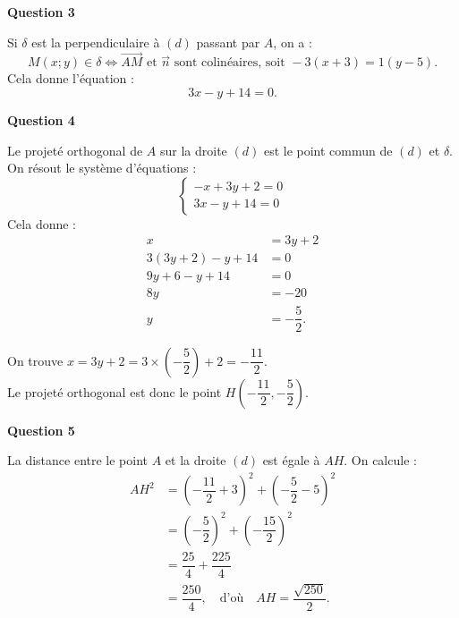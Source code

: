 \documentclass[10pt]{article}
\begin{document}
	\textbf{Question 3}
	
	Si $\delta$ est la perpendiculaire à $(d)$ passant par $A$, on a :
	\[
	M(x; y) \in \delta \iff \overrightarrow{AM} \text{ et } \vec{n} \text{ sont colinéaires, soit } -3(x + 3) = 1(y - 5).
	\]
	Cela donne l'équation :
	\[
	3x - y + 14 = 0.
	\]
	
\textbf{Question 4}

Le projeté orthogonal de $A$ sur la droite $(d)$ est le point commun de $(d)$ et $\delta$. On résout le système d'équations :
\[
\begin{cases}
	-x + 3y + 2 = 0 \\
	3x - y + 14 = 0
\end{cases}
\]
Cela donne :
\begin{align*}
	x &= 3y + 2 \\
	3(3y + 2) - y + 14 &= 0 \\
	9y + 6 - y + 14 &= 0 \\
	8y &= -20 \\
	y &= -\dfrac{5}{2}.
\end{align*}

On trouve $x = 3y + 2 = 3 \times \left(-\dfrac{5}{2}\right) + 2 = -\dfrac{11}{2}$.\\
 Le projeté orthogonal est donc le point $H\left(-\dfrac{11}{2}, -\dfrac{5}{2}\right)$.

\textbf{Question 5}

La distance entre le point $A$ et la droite $(d)$ est égale à $AH$. On calcule :
\begin{align*}
	AH^2 &= \left(-\dfrac{11}{2} + 3\right)^2 + \left(-\dfrac{5}{2} - 5\right)^2 \\
	&= \left(-\dfrac{5}{2}\right)^2 + \left(-\dfrac{15}{2}\right)^2 \\
	&= \dfrac{25}{4} + \dfrac{225}{4} \\
	&= \dfrac{250}{4}, \quad \text{d'où} \quad AH = \dfrac{\sqrt{250}}{2}.
\end{align*}
\end{document}
